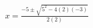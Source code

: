 \documentclass[preview]{standalone}
\begin{document}
\begin{align*}
x = \frac{ -5  \pm \sqrt{ 5 ^2 - 4( 2 )( -3 )}}{2( 2 )}
\end{align*}
\end{document}
